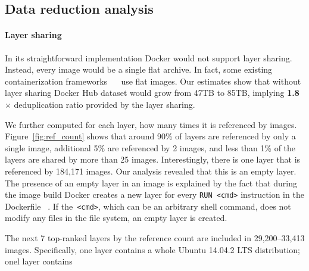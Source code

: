 \subsection{Data reduction analysis} 
\label{sec:dedup_ratio}

\paragraph{Layer sharing}

In its  straightforward implementation Docker would not support layer sharing.
%
Instead, every image would be a single flat archive.
%
In fact, some existing containerization frameworks
~\cite{singularity}~\cite{openvz} 
%
use flat images.
%
Our estimates show that without layer sharing Docker Hub dataset would grow
from 47TB to 85TB, implying \textbf{1.8$\times$} deduplication ratio provided
by the layer sharing.
 
We further computed for each layer, how many times it is referenced by images.
%
Figure~\ref{fig:ref_count} shows that around 90\% of layers are referenced by
only a single image, additional 5\% are referenced by 2 images, and less than
1\% of the layers are shared by more than 25 images.
%
Interestingly, there is one layer that is referenced by 184,171 images.  Our
analysis revealed that this is an empty layer.
%
The presence of an empty layer in an image is explained
by the fact that during the image build Docker creates a new layer
for every \texttt{RUN <cmd>} instruction
in the Dockerfile~
.
%
If the~\texttt{<cmd>}, which can be an arbitrary shell command,
does not modify any files in the file system,
an empty layer is created.
%

The next 7 top-ranked layers by the reference count
are included in 29,200--33,413 images.
Specifically, one layer contains a whole Ubuntu 14.04.2 LTS distribution; onel layer contains
%
%
%

